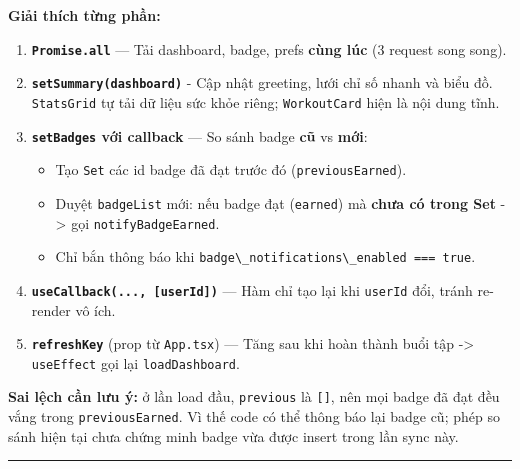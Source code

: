\documentclass[12pt,a4paper]{article}
\providecommand{\passthrough}[1]{#1}
\providecommand{\tightlist}{%
  \setlength{\itemsep}{0pt}\setlength{\parskip}{0pt}}
\begin{document}
\textbf{Giải thích từng phần:}

\begin{enumerate}
\def\labelenumi{\arabic{enumi}.}
\tightlist
\item
  \textbf{\passthrough{\lstinline!Promise.all!}} --- Tải dashboard,
  badge, prefs \textbf{cùng lúc} (3 request song song).
\item
  \textbf{\passthrough{\lstinline!setSummary(dashboard)!}} - Cập nhật
  greeting, lưới chỉ số nhanh và biểu đồ.
  \passthrough{\lstinline!StatsGrid!} tự tải dữ liệu sức khỏe riêng;
  \passthrough{\lstinline!WorkoutCard!} hiện là nội dung tĩnh.
\item
  \textbf{\passthrough{\lstinline!setBadges!} với callback} --- So sánh
  badge \textbf{cũ} vs \textbf{mới}:

  \begin{itemize}
  \tightlist
  \item
    Tạo \passthrough{\lstinline!Set!} các id badge đã đạt trước đó
    (\passthrough{\lstinline!previousEarned!}).
  \item
    Duyệt \passthrough{\lstinline!badgeList!} mới: nếu badge đạt
    (\passthrough{\lstinline!earned!}) mà \textbf{chưa có trong Set}
    -\textgreater{} gọi \passthrough{\lstinline!notifyBadgeEarned!}.
  \item
    Chỉ bắn thông báo khi
    \passthrough{\lstinline!badge\_notifications\_enabled === true!}.
  \end{itemize}
\item
  \textbf{\passthrough{\lstinline!useCallback(..., [userId])!}} --- Hàm
  chỉ tạo lại khi \passthrough{\lstinline!userId!} đổi, tránh re-render
  vô ích.
\item
  \textbf{\passthrough{\lstinline!refreshKey!}} (prop từ
  \passthrough{\lstinline!App.tsx!}) --- Tăng sau khi hoàn thành buổi
  tập -\textgreater{} \passthrough{\lstinline!useEffect!} gọi lại
  \passthrough{\lstinline!loadDashboard!}.
\end{enumerate}

\textbf{Sai lệch cần lưu ý:} ở lần load đầu,
\passthrough{\lstinline!previous!} là \passthrough{\lstinline![]!}, nên
mọi badge đã đạt đều vắng trong
\passthrough{\lstinline!previousEarned!}. Vì thế code có thể thông báo
lại badge cũ; phép so sánh hiện tại chưa chứng minh badge vừa được
insert trong lần sync này.

\begin{center}\rule{0.5\linewidth}{0.5pt}\end{center}
\end{document}
